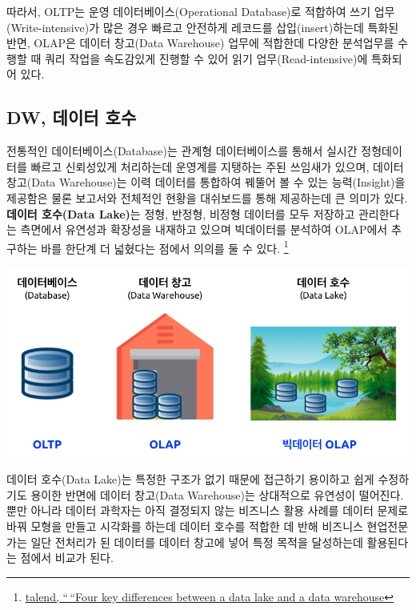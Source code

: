 \documentclass[
  letterpaper,
  chapter,a4paper,showtrims,openright,hidelinks]{oblivoir}
\begin{document}
따라서, OLTP는 운영 데이터베이스(Operational Database)로 적합하여 쓰기
업무(Write-intensive)가 많은 경우 빠르고 안전하게 레코드를
삽입(insert)하는데 특화된 반면, OLAP은 데이터 창고(Data Warehouse)
업무에 적합한데 다양한 분석업무를 수행할 때 쿼리 작업을 속도감있게
진행할 수 있어 읽기 업무(Read-intensive)에 특화되어 있다.

\hypertarget{database-warehouse-lake}{%
\subsection{DW, 데이터 호수}\label{database-warehouse-lake}}

전통적인 데이터베이스(Database)는 관계형 데이터베이스를 통해서 실시간
정형데이터를 빠르고 신뢰성있게 처리하는데 운영계를 지탱하는 주된
쓰임새가 있으며, 데이터 창고(Data Warehouse)는 이력 데이터를 통합하여
꿰뚤어 볼 수 있는 능력(Insight)을 제공함은 물론 보고서와 전체적인 현황을
대쉬보드를 통해 제공하는데 큰 의미가 있다. \textbf{데이터 호수(Data
Lake)}는 정형, 반정형, 비정형 데이터를 모두 저장하고 관리한다는 측면에서
유연성과 확장성을 내재하고 있으며 빅데이터를 분석하여 OLAP에서 추구하는
바를 한단계 더 넓혔다는 점에서 의의를 둘 수 있다. \footnote{\href{https://www.talend.com/resources/data-lake-vs-data-warehouse/}{talend,
  ``\,``Four key differences between a data lake and a data warehouse}}

\includegraphics{images/database_data_lake.png}

데이터 호수(Data Lake)는 특정한 구조가 없기 때문에 접근하기 용이하고
쉽게 수정하기도 용이한 반면에 데이터 창고(Data Warehouse)는 상대적으로
유연성이 떨어진다. 뿐만 아니라 데이터 과학자는 아직 결정되지 않는
비즈니스 활용 사례를 데이터 문제로 바꿔 모형을 만들고 시각화를 하는데
데이터 호수를 적합한 데 반해 비즈니스 현업전문가는 일단 전처리가 된
데이터를 데이터 창고에 넣어 특정 목적을 달성하는데 활용된다는 점에서
비교가 된다.
\end{document}
